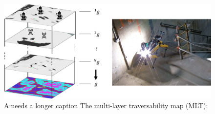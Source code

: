\documentclass[letterpaper, 10pt, conference]{ieeeconf}      %
\newcommand{\ali}[1]{{\color{orange}A:#1}} %
\newcommand{\rev}[1]{{\color{blue}#1}} %
\begin{document}


\begin{figure}[thpb]
  \centering
  \includegraphics[width=\linewidth]{spot_iros/graphics/MLT.png}
  \caption{\ali{needs a longer caption} \rev{The multi-layer traversability map (MLT):}}
  \label{fig:layered_costmap}
\end{figure}
\end{document}

